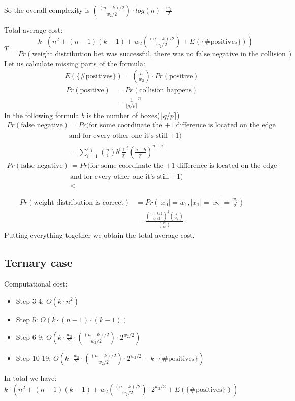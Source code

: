 \documentclass[12pt]{article}
\begin{document}
So the overall complexity is  $\binom{(n-k)/2}{w_2/2} \cdot log(n) \cdot \frac{w_2}{2}$

Total average cost:
\[
    T = \frac{k \cdot (n^2 + (n-1)(k-1) + w_2\binom{(n-k)/2}{w_2/2} + E(\{\text{\# positives}\}))}{Pr(\text{weight distribution bet was successful, there was no false negative in the collision search})}
\]
Let us calculate missing parts of the formula:
\[
\begin{split}
    E(\{\text{\#positives}\}) = \binom{n}{w_2} \cdot Pr(\text{positive})
\end{split}
\]
\[
\begin{split}
    Pr(\text{positive}) & = Pr(\text{collision happens}) \\
    & = \frac{1}{\lfloor q/p \rceil}^{n}
\end{split}
\]
In the following formula $b$ is the number of boxes($\lfloor q/p \rceil$)
\[
\begin{split}
    Pr(\text{false negative}) & = Pr(\text{for some coordinate the +1 difference is located on the edge of the box} \\
    & \text{and for every other one it's still +1}) \\
    & = \sum_{i = 1}^{w_1}\binom{n}{i}b^{i}\frac{1}{q^2}^{i}(\frac{q-b}{q^2})^{n-i}
\end{split}
\]
\[
\begin{split}
    Pr(\text{false negative}) & = Pr(\text{for some coordinate the +1 difference is located on the edge of the box} \\
    & \text{and for every other one it's still +1}) \\
    & <
\end{split}
\]

\[
\begin{split}
    Pr(\text{weight distribution is correct}) & = Pr(|x_0| = w_1, |x_1| = |x_2| = \frac{w_2}{2}) \\
    & = \frac{\binom{n-k/2}{w_2/2}^{2}\binom{k}{w_1}}{\binom{n}{w}}
\end{split}
\]
Putting everything together we obtain the total average cost.

\subsection{Ternary case}

Computational cost:
\begin{itemize}
    \item Step 3-4: $O(k \cdot n^2)$
    \item Step 5: $O(k \cdot (n-1) \cdot (k-1))$
    \item Step 6-9: $O(k \cdot \frac{w_2}{2} \cdot \binom{(n-k)/2}{w_2/2} \cdot 2^{w_2/2})$
    \item Step 10-19: $O(k \cdot \frac{w_2}{2} \cdot \binom{(n-k)/2}{w_2/2} \cdot 2^{w_2/2} + k \cdot \{\text{\# positives}\})$
\end{itemize}
In total we have: $k \cdot (n^2 + (n-1)(k-1) + w_2\binom{(n-k)/2}{w_2/2} \cdot 2^{w_2/2} + E(\{\text{\# positives}\}))$
\end{document}
